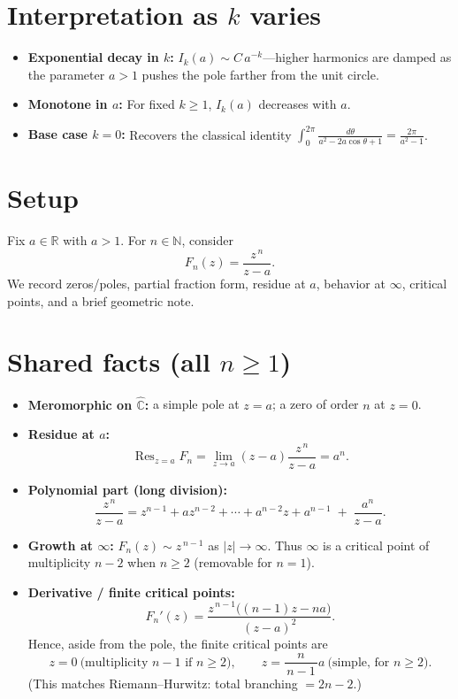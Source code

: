 \documentclass[11pt]{article}
\DeclareMathOperator{\Res}{Res}
\begin{document}
\section*{Interpretation as $k$ varies}
\begin{itemize}
	\item \textbf{Exponential decay in $k$:} $I_k(a)\sim C\,a^{-k}$—higher harmonics are damped as the parameter $a>1$
	pushes the pole farther from the unit circle.
	\item \textbf{Monotone in $a$:} For fixed $k\ge1$, $I_k(a)$ decreases with $a$.
	\item \textbf{Base case $k=0$:} Recovers the classical identity
	$\displaystyle \int_{0}^{2\pi}\frac{d\theta}{a^2-2a\cos\theta+1}=\frac{2\pi}{a^2-1}$.
\end{itemize}

\section*{Setup}
Fix $a\in\mathbb R$ with $a>1$. For $n\in\mathbb N$, consider
\[
F_n(z)=\frac{z^{\,n}}{z-a}.
\]
We record zeros/poles, partial fraction form, residue at $a$, behavior at $\infty$,
critical points, and a brief geometric note.

\section*{Shared facts (all $n\ge1$)}
\begin{itemize}
	\item \textbf{Meromorphic on $\widehat{\mathbb C}$:} a simple pole at $z=a$; a zero of order $n$ at $z=0$.
	\item \textbf{Residue at $a$:}
	\[
	\Res_{z=a} F_n=\lim_{z\to a}(z-a)\frac{z^{\,n}}{z-a}=a^{n}.
	\]
	\item \textbf{Polynomial part (long division):}
	\[
	\frac{z^{\,n}}{z-a}
	= z^{n-1}+a z^{n-2}+\cdots + a^{n-2}z + a^{n-1} \;+\; \frac{a^{n}}{z-a}.
	\]
	\item \textbf{Growth at $\infty$:} $F_n(z)\sim z^{\,n-1}$ as $|z|\to\infty$.
	Thus $\infty$ is a critical point of multiplicity $n-2$ when $n\ge2$ (removable for $n=1$).
	\item \textbf{Derivative / finite critical points:}
	\[
	F_n'(z)=\frac{z^{\,n-1}\big((n-1)z-na\big)}{(z-a)^2}.
	\]
	Hence, aside from the pole, the finite critical points are
	\[
	z=0 \ \text{(multiplicity $n-1$ if $n\ge2$)},\qquad
	z=\frac{n}{\,n-1\,}a \ \text{(simple, for $n\ge2$)}.
	\]
	(This matches Riemann--Hurwitz: total branching $=2n-2$.)
\end{itemize}
\end{document}
